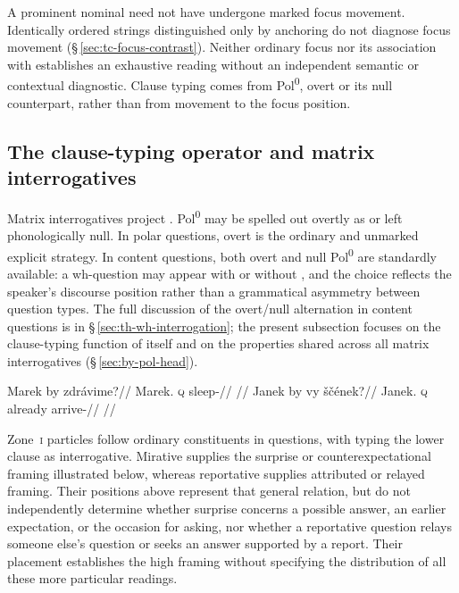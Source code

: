 A prominent nominal need not have undergone marked focus movement.
 Identically ordered strings distinguished only by anchoring do not diagnose
 focus movement (§\,\ref{sec:tc-focus-contrast}). Neither ordinary focus nor
 its association with  establishes an exhaustive reading without
 an independent semantic or contextual diagnostic. Clause typing comes from
 Pol\textsuperscript{0}, overt  or its null counterpart, rather than
 from movement to the focus position.

\subsection{The clause-typing operator  and matrix interrogatives}
\label{sec:th-polar-questions}

Matrix interrogatives project . Pol\textsuperscript{0} may be
spelled out overtly as  or left phonologically null. In polar questions,
overt  is the ordinary and unmarked explicit strategy. In content
questions, both overt  and null Pol\textsuperscript{0} are standardly
available: a wh-question may appear with or without , and the choice
reflects the speaker's discourse position rather than a grammatical asymmetry
between question types. The full discussion of the overt/null alternation in
content questions is in §\,\ref{sec:th-wh-interrogation}; the present subsection
focuses on the clause-typing function of  itself and on the properties
shared across all matrix interrogatives (§\,\ref{sec:by-pol-head}).

\pex
\a
\begingl
\gla Marek by zdrávime?//
\glb Marek.\Dir{} \textsc{q} sleep-\Prog{}//
\glft {}//
\endgl
\a
\begingl
\gla Janek by vy ščének?//
\glb Janek.\Dir{} \textsc{q} already arrive-\Pf{}//
\glft {}//
\endgl
\xe

Zone~\textsc{i} particles follow ordinary constituents in questions,
with  typing the lower clause as interrogative. Mirative 
supplies the surprise or counterexpectational framing illustrated below,
whereas reportative  supplies attributed or relayed framing. Their
positions above  represent that general relation, but do not
independently determine whether surprise concerns a possible answer, an
earlier expectation, or the occasion for asking, nor whether a reportative
question relays someone else's question or seeks an answer supported by a
report. Their placement establishes the high framing without
specifying the distribution of all these more particular readings.


